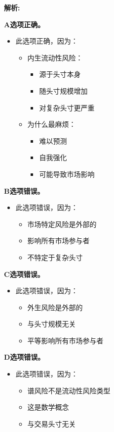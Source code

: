 \documentclass{article}
\newenvironment{explanation}
{\textbf{解析:}\par}
{\par}
\begin{document}
\begin{explanation}
    \textbf{A选项正确。}
    \begin{itemize}
        \item 此选项正确，因为：
        \begin{itemize}
            \item 内生流动性风险：
            \begin{itemize}
                \item 源于头寸本身
                \item 随头寸规模增加
                \item 对复杂头寸更严重
            \end{itemize}
            \item 为什么最麻烦：
            \begin{itemize}
                \item 难以预测
                \item 自我强化
                \item 可能导致市场影响
            \end{itemize}
        \end{itemize}
    \end{itemize}
    \textbf{B选项错误。}
    \begin{itemize}
        \item 此选项错误，因为：
        \begin{itemize}
            \item 市场特定风险是外部的
            \item 影响所有市场参与者
            \item 不特定于复杂头寸
        \end{itemize}
    \end{itemize}
    \textbf{C选项错误。}
    \begin{itemize}
        \item 此选项错误，因为：
        \begin{itemize}
            \item 外生风险是外部的
            \item 与头寸规模无关
            \item 平等影响所有市场参与者
        \end{itemize}
    \end{itemize}
    \textbf{D选项错误。}
    \begin{itemize}
        \item 此选项错误，因为：
        \begin{itemize}
            \item 谱风险不是流动性风险类型
            \item 这是数学概念
            \item 与交易头寸无关
        \end{itemize}
    \end{itemize}
\end{explanation}
\end{document}
